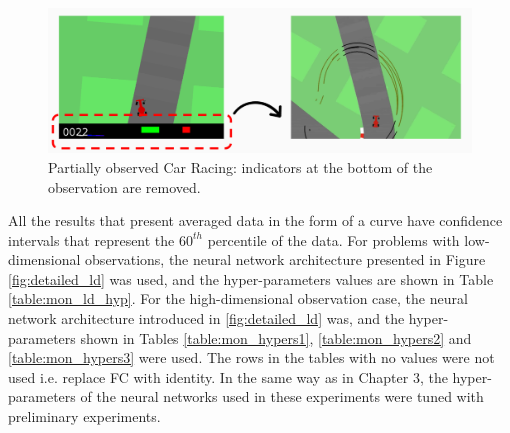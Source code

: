 \begin{figure}[h]
    \centering
    \includegraphics[width=0.7\linewidth]{imagenes/cap4/car_racing_no_inds.PNG}
    \caption[Partially observed Car Racing.]{Partially observed Car Racing: indicators at the bottom of the observation are removed.}
    \label{fig:no_inds_car_racing}
\end{figure}

All the results that present averaged data in the form of a curve have confidence intervals that represent the $60^{th}$ percentile of the data. For problems with low-dimensional observations, the neural network architecture presented in Figure \ref{fig:detailed_ld} was used, and the hyper-parameters values are shown in Table \ref{table:mon_ld_hyp}. For the high-dimensional observation case, the neural network architecture introduced in \ref{fig:detailed_ld} was, and the hyper-parameters shown in Tables \ref{table:mon_hypers1}, \ref{table:mon_hypers2} and \ref{table:mon_hypers3} were used. The rows in the tables with no values were not used i.e. replace FC with identity. In the same way as in Chapter 3, the hyper-parameters of the neural networks used in these experiments were tuned with preliminary experiments.

